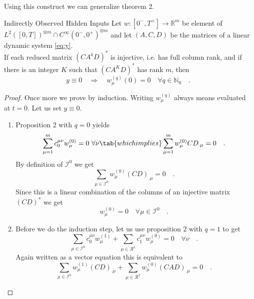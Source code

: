 Using this construct we can generalize theorem 2.
\begin{theorem}{Indirectly Observed Hidden Inputs}{}
	Let $w:[0^-,T^+]\to \mathbb{R}^m$ be element of $L^2([0,T])^{\otimes m}\cap C^\infty 
	(0^-,0^+)^{\otimes m}$ and let $(A,C,D)$ be the matrices of a linear dynamic system 
	\eqref{eq:y}. \\
	If each reduced matrix $(CA^kD)^*$ is injective, i.e. has full column rank, and if 
	there is an integer $K$ such that $(CA^KD)^*$ has rank $m$, then
	\begin{equation}
	y\equiv 0 \quad \Rightarrow \quad w_\mu^{(q)} (0) = 0 \quad \forall q \in \mathbb{N}_0 
	\quad .
	\end{equation}
\end{theorem}
\begin{proof}
	Once more we prove by induction. Writing $w_\mu^{(q)}$ always means evaluated 
	at $t=0$. Let us set $y\equiv 0$.
	\begin{enumerate}
	\item	Proposition 2 with $q=0$ yields 
			\begin{equation}
			\sum\limits_{\mu=1}^m c_0^{\mu \nu} w_\mu^{(0)} = 0  \,\, \forall \nu 
			\tab{which implies}
			 \sum\limits_{\mu=1}^m w_\mu^{(0)} CD_{.\mu}  = 0 \quad .
			\end{equation}
			By definition of $\mathcal{I}^0$ we get
			\begin{equation}
			\sum\limits_{\mu\in\mathcal{I}^0} w_\mu^{(0)} (CD)_{.\mu} = 0 \quad .
			\end{equation}
			Since this is a linear combination of the columns of an injective matrix
			$(CD)^*$ we get
			\begin{equation}
			w_\mu^{(0)} = 0 \quad \forall \mu \in \mathcal{I}^0 \quad .
			\end{equation}
	\item	Before we do the induction step, let us use proposition 2 with $q=1$ to get
			\begin{equation}
			\sum\limits_{\mu \in \mathcal{I}^0} c_0^{\mu\nu} w_\mu^{(1)} + 
			\sum\limits_{\mu\in\mathcal{R}^1} c_1^{\mu\nu} w_\mu^{(0)} = 0 \quad \forall
			\nu \quad .
			\end{equation}
			Again written as a vector equation this is equivalent to
			\begin{equation}
			\sum\limits_{\mu \in \mathcal{I}^0} w_\mu^{(1)} (CD)_{.\mu} + 
			\sum\limits_{\mu\in\mathcal{R}^1}  w_\mu^{(0)} (CAD)_{.\mu} = 0  \quad .
			\end{equation}

\end{enumerate}
\end{proof}
